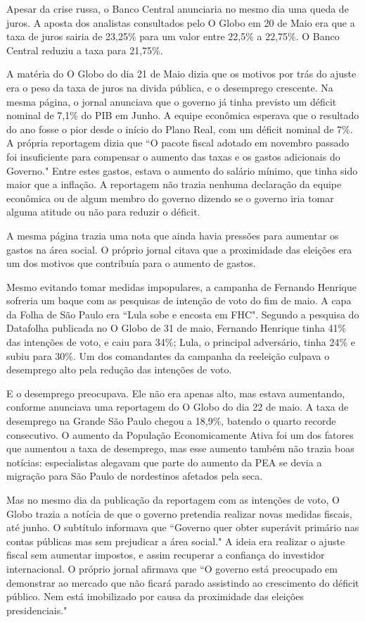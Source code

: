 \documentclass{article}
\begin{document}
Apesar da crise russa, o Banco Central anunciaria no mesmo dia uma queda de juros. A aposta dos analistas consultados pelo O Globo em 20 de Maio era que a taxa de juros sairia de 23,25\% para um valor entre 22,5\% a 22,75\%. O Banco Central reduziu a taxa para 21,75\%.  

A matéria do O Globo do dia 21 de Maio dizia que os motivos por trás do ajuste era o peso da taxa de juros na divida pública, e o desemprego crescente. Na mesma página, o jornal anunciava que o governo já tinha previsto um déficit nominal de 7,1\% do PIB em Junho. A equipe econômica esperava que o resultado do ano fosse o pior desde o início do Plano Real, com um déficit nominal de 7\%. A própria reportagem dizia que ``O pacote fiscal adotado em novembro passado foi insuficiente para compensar o aumento das taxas e os gastos adicionais do Governo." Entre estes gastos, estava o aumento do salário mínimo, que tinha sido maior que a inflação. A reportagem não trazia nenhuma declaração da equipe econômica ou de algum membro do governo dizendo se o governo iria tomar alguma atitude ou não para reduzir o déficit.

A mesma página trazia uma nota que ainda havia pressões para aumentar os gastos na área social. O próprio jornal citava que a proximidade das eleições era um dos motivos que contribuía para o aumento de gastos.   

Mesmo evitando tomar medidas impopulares, a campanha de Fernando Henrique sofreria um baque com as pesquisas de intenção de voto do fim de maio. A capa da Folha de São Paulo era ``Lula sobe e encosta em FHC". Segundo a pesquisa do Datafolha publicada no O Globo de 31 de maio, Fernando Henrique tinha 41\% das intenções de voto, e caiu para 34\%; Lula, o principal adversário, tinha 24\% e subiu para 30\%. Um dos comandantes da campanha da reeleição culpava o desemprego alto pela redução das intenções de voto.        

E o desemprego preocupava. Ele não era apenas alto, mas estava aumentando, conforme anunciava uma reportagem do O Globo do dia 22 de maio. A taxa de desemprego na Grande São Paulo chegou a 18,9\%, batendo o quarto recorde consecutivo. O aumento da População Economicamente Ativa foi um dos fatores que aumentou a taxa de desemprego, mas esse aumento também não trazia boas notícias: especialistas alegavam que parte do aumento da PEA se devia a migração para São Paulo de nordestinos afetados pela seca. 

Mas no mesmo dia da publicação da reportagem com as intenções de voto, O Globo trazia a notícia de que o governo pretendia realizar novas medidas fiscais, até junho. O subtítulo informava que ``Governo quer obter superávit primário nas contas públicas mas sem prejudicar a área social." A ideia era realizar o ajuste fiscal sem aumentar impostos, e assim recuperar a confiança do investidor internacional. O próprio jornal afirmava que ``O governo está preocupado em demonstrar ao mercado que não ficará parado assistindo ao crescimento do déficit público. Nem está imobilizado por causa da proximidade das eleições presidenciais." 
\end{document}
